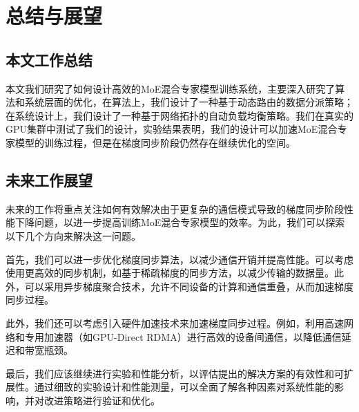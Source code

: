 \chapter{总结与展望}

\section{本文工作总结}

本文我们研究了如何设计高效的MoE混合专家模型训练系统，主要深入研究了算法和系统层面的优化，在算法上，我们设计了一种基于动态路由的数据分派策略；在系统设计上，我们设计了一种基于网络拓扑的自动负载均衡策略。我们在真实的GPU集群中测试了我们的设计，实验结果表明，我们的设计可以加速MoE混合专家模型的训练过程，但是在梯度同步阶段仍然存在继续优化的空间。

\section{未来工作展望}

未来的工作将重点关注如何有效解决由于更复杂的通信模式导致的梯度同步阶段性能下降问题，以进一步提高训练MoE混合专家模型的效率。为此，我们可以探索以下几个方向来解决这一问题。

首先，我们可以进一步优化梯度同步算法，以减少通信开销并提高性能。可以考虑使用更高效的同步机制，如基于稀疏梯度的同步方法，以减少传输的数据量。此外，可以采用异步梯度聚合技术，允许不同设备的计算和通信重叠，从而加速梯度同步过程。

此外，我们还可以考虑引入硬件加速技术来加速梯度同步过程。例如，利用高速网络和专用加速器（如GPU-Direct RDMA）进行高效的设备间通信，以降低通信延迟和带宽瓶颈。

最后，我们应该继续进行实验和性能分析，以评估提出的解决方案的有效性和可扩展性。通过细致的实验设计和性能测量，可以全面了解各种因素对系统性能的影响，并对改进策略进行验证和优化。

\endinput